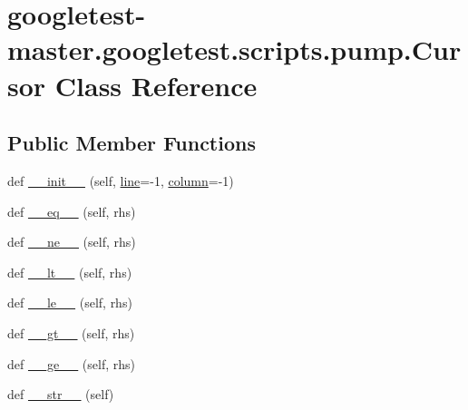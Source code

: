 \hypertarget{classgoogletest-master_1_1googletest_1_1scripts_1_1pump_1_1_cursor}{}\section{googletest-\/master.googletest.\+scripts.\+pump.\+Cursor Class Reference}
\label{classgoogletest-master_1_1googletest_1_1scripts_1_1pump_1_1_cursor}
\subsection*{Public Member Functions}
\begin{DoxyCompactItemize}
\item 
def \mbox{\hyperlink{classgoogletest-master_1_1googletest_1_1scripts_1_1pump_1_1_cursor_a7557d2a355fd7708f6c60535fe30eea7}{\+\_\+\+\_\+init\+\_\+\+\_\+}} (self, \mbox{\hyperlink{classgoogletest-master_1_1googletest_1_1scripts_1_1pump_1_1_cursor_ae223ac7e9a32aab12d78ff9a43bdd250}{line}}=-\/1, \mbox{\hyperlink{classgoogletest-master_1_1googletest_1_1scripts_1_1pump_1_1_cursor_a963de3452b99715edfe4d3e0efe2727f}{column}}=-\/1)
\item 
def \mbox{\hyperlink{classgoogletest-master_1_1googletest_1_1scripts_1_1pump_1_1_cursor_a0d224620d8a9678db492b611e88af5ea}{\+\_\+\+\_\+eq\+\_\+\+\_\+}} (self, rhs)
\item 
def \mbox{\hyperlink{classgoogletest-master_1_1googletest_1_1scripts_1_1pump_1_1_cursor_aa038b19d289ec615c89833d77f83247f}{\+\_\+\+\_\+ne\+\_\+\+\_\+}} (self, rhs)
\item 
def \mbox{\hyperlink{classgoogletest-master_1_1googletest_1_1scripts_1_1pump_1_1_cursor_a8a9838c63fe47c387934524ffd38960d}{\+\_\+\+\_\+lt\+\_\+\+\_\+}} (self, rhs)
\item 
def \mbox{\hyperlink{classgoogletest-master_1_1googletest_1_1scripts_1_1pump_1_1_cursor_a3e4f24b37a7f3b043732c95d89d5451f}{\+\_\+\+\_\+le\+\_\+\+\_\+}} (self, rhs)
\item 
def \mbox{\hyperlink{classgoogletest-master_1_1googletest_1_1scripts_1_1pump_1_1_cursor_a669d60170a5c5f4473cef90e5bde7e78}{\+\_\+\+\_\+gt\+\_\+\+\_\+}} (self, rhs)
\item 
def \mbox{\hyperlink{classgoogletest-master_1_1googletest_1_1scripts_1_1pump_1_1_cursor_ac940489897d27cf1409698419a4e1459}{\+\_\+\+\_\+ge\+\_\+\+\_\+}} (self, rhs)
\item 
def \mbox{\hyperlink{classgoogletest-master_1_1googletest_1_1scripts_1_1pump_1_1_cursor_aa08db32c7b74936594857761b7745eb1}{\+\_\+\+\_\+str\+\_\+\+\_\+}} (self)

\end{DoxyCompactItemize}
